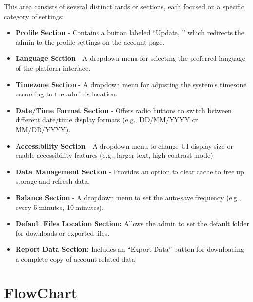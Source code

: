 \documentclass[11pt,a4paper]{article}
\begin{document}
	This area consists of several distinct cards or sections, each focused on a specific category of settings:
	\begin{itemize}
		\item \textbf{Profile Section} - Contains a button labeled ``Update, '' which redirects the admin to the profile settings on the account page.
		\item \textbf{Language Section} - A dropdown menu for selecting the preferred language of the platform interface.
		\item \textbf{Timezone Section} - A dropdown menu for adjusting the system's timezone according to the admin’s location.
		\item \textbf{Date/Time Format Section} - Offers radio buttons to switch between different date/time display formats (e.g., DD/MM/YYYY or MM/DD/YYYY).
		\item \textbf{Accessibility Section} - A dropdown menu to change UI display size or enable accessibility features (e.g., larger text, high-contrast mode).
		\item \textbf{Data Management Section} - Provides an option to clear cache to free up storage and refresh data.
		\item \textbf{Balance Section} - A dropdown menu to set the auto-save frequency (e.g., every 5 minutes, 10 minutes).
		\item \textbf{Default Files Location Section:} Allows the admin to set the default folder for downloads or exported files.
		\item \textbf{Report Data Section:} Includes an ``Export Data'' button for downloading a complete copy of account-related data.
	\end{itemize}
	\newpage
	\section{FlowChart}\label{sec:few}
\end{document}
